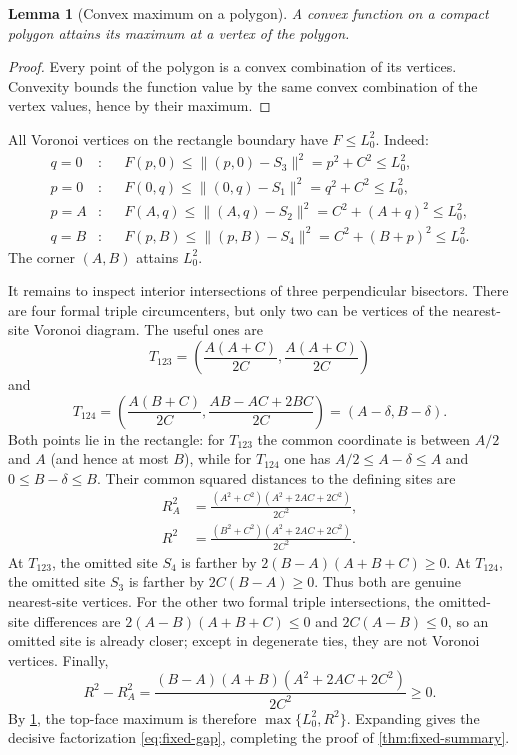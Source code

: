 \documentclass[11pt]{article}
\newtheorem{lemma}[theorem]{Lemma}
\theoremstyle{definition}
\begin{document}
\begin{lemma}[Convex maximum on a polygon]\label{lem:convex-poly}
A convex function on a compact polygon attains its maximum at a vertex of the
polygon.
\end{lemma}

\begin{proof}
Every point of the polygon is a convex combination of its vertices.  Convexity
bounds the function value by the same convex combination of the vertex
values, hence by their maximum.
\end{proof}

All Voronoi vertices on the rectangle boundary have $F\le L_0^2$.  Indeed:
\begin{align*}
 q=0 &: &&F(p,0)\le\lVert(p,0)-S_3\rVert^2=p^2+C^2\le L_0^2,\\
 p=0 &: &&F(0,q)\le\lVert(0,q)-S_1\rVert^2=q^2+C^2\le L_0^2,\\
 p=A &: &&F(A,q)\le\lVert(A,q)-S_2\rVert^2=C^2+(A+q)^2\le L_0^2,\\
 q=B &: &&F(p,B)\le\lVert(p,B)-S_4\rVert^2=C^2+(B+p)^2\le L_0^2.
\end{align*}
The corner $(A,B)$ attains $L_0^2$.

It remains to inspect interior intersections of three perpendicular
bisectors.  There are four formal triple circumcenters, but only two can be
vertices of the nearest-site Voronoi diagram.  The useful ones are
\begin{equation}\label{eq:T123}
  T_{123}=\left(\frac{A(A+C)}{2C},\frac{A(A+C)}{2C}\right)
\end{equation}
and
\begin{equation}\label{eq:T124}
  T_{124}=\left(\frac{A(B+C)}{2C},
  \frac{AB-AC+2BC}{2C}\right)=(A-\delta,B-\delta).
\end{equation}
Both points lie in the rectangle: for $T_{123}$ the common coordinate is
between $A/2$ and $A$ (and hence at most $B$), while for $T_{124}$ one has
$A/2\le A-\delta\le A$ and $0\le B-\delta\le B$.
Their common squared distances to the defining sites are
\begin{align}
 R_A^2&=\frac{(A^2+C^2)(A^2+2AC+2C^2)}{2C^2},\label{eq:RA}\\
 R^2&=\frac{(B^2+C^2)(A^2+2AC+2C^2)}{2C^2}.
\end{align}
At $T_{123}$, the omitted site $S_4$ is farther by
$2(B-A)(A+B+C)\ge0$.  At $T_{124}$, the omitted site $S_3$ is farther by
$2C(B-A)\ge0$.  Thus both are genuine nearest-site vertices.  For the other
two formal triple intersections, the omitted-site differences are
$2(A-B)(A+B+C)\le0$ and $2C(A-B)\le0$, so an omitted site is already closer;
except in degenerate ties, they are not Voronoi vertices.  Finally,
\begin{equation}\label{eq:RgeRA}
  R^2-R_A^2=
  \frac{(B-A)(A+B)(A^2+2AC+2C^2)}{2C^2}\ge0.
\end{equation}
By \cref{lem:convex-poly}, the top-face maximum is therefore
$\max\{L_0^2,R^2\}$.  Expanding gives the decisive factorization
\eqref{eq:fixed-gap}, completing the proof of \cref{thm:fixed-summary}.
\end{document}
